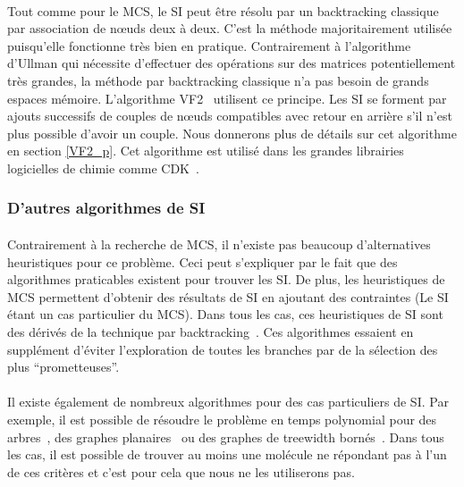 \documentclass[12pt,french,twoside]{report}
\begin{document}
\paragraph{}Tout comme pour le MCS, le SI peut être résolu par un backtracking classique par association de n\oe{}uds deux à deux.
C'est la méthode majoritairement utilisée puisqu'elle fonctionne très bien en pratique.
Contrairement à l'algorithme d'Ullman qui nécessite d'effectuer des opérations sur des matrices potentiellement très grandes, la méthode par backtracking classique n'a pas besoin de grands espaces mémoire.
L'algorithme VF2~\cite{cordella_subgraph_2004} utilisent ce principe.
Les SI se forment par ajouts successifs de couples de n\oe{}uds compatibles avec retour en arrière s'il n'est plus possible d'avoir un couple.
Nous donnerons plus de détails sur cet algorithme en section \ref{VF2_p}.
Cet algorithme est utilisé dans les grandes librairies logicielles de chimie comme CDK~\cite{steinbeck_chemistry_2003}.


\subsubsection{D'autres algorithmes de SI}

\paragraph{}Contrairement à la recherche de MCS, il n'existe pas beaucoup d'alternatives heuristiques pour ce problème.
Ceci peut s'expliquer par le fait que des algorithmes praticables existent pour trouver les SI.
De plus, les heuristiques de MCS permettent d'obtenir des résultats de SI en ajoutant des contraintes (Le SI étant un cas particulier du MCS).
Dans tous les cas, ces heuristiques de SI sont des dérivés de la technique par backtracking~\cite{kaijar_developing_2012}.
Ces algorithmes essaient en supplément d'éviter l'exploration de toutes les branches par de la sélection des plus ``prometteuses''.

\paragraph{}Il existe également de nombreux algorithmes pour des cas particuliers de SI.
Par exemple, il est possible de résoudre le problème en temps polynomial pour des arbres~\cite{shamir_faster_1997}, des graphes planaires~\cite{eppstein_subgraph_1995,dorn_planar_2009} ou des graphes de treewidth bornés~\cite{hajiaghayi_subgraph_2007}.
Dans tous les cas, il est possible de trouver au moins une molécule ne répondant pas à l'un de ces critères et c'est pour cela que nous ne les utiliserons pas.
\end{document}

